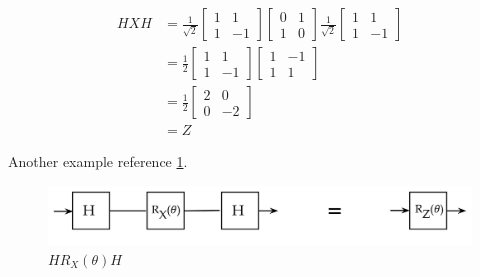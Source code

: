 \documentclass[main.tex]{subfiles}
\begin{document}
    $$
    \begin{aligned}
    H X H &=\frac{1}{\sqrt{2}}\left[\begin{array}{cc}
    1 & 1 \\
    1 & -1
    \end{array}\right]\left[\begin{array}{cc}
    0 & 1 \\
    1 & 0
    \end{array}\right] \frac{1}{\sqrt{2}}\left[\begin{array}{cc}
    1 & 1 \\
    1 & -1
    \end{array}\right] \\
    &=\frac{1}{2}\left[\begin{array}{cc}
    1 & 1 \\
    1 & -1
    \end{array}\right]\left[\begin{array}{cc}
    1 & -1 \\
    1 & 1
    \end{array}\right] \\
    &=\frac{1}{2}\left[\begin{array}{cc}
    2 & 0 \\
    0 & -2
    \end{array}\right] \\
    &=Z
    \end{aligned}
    $$
    
    Another example reference \ref{fig:09gate8}.
    
    \begin{figure}
        \centering
        \includegraphics[width=5in]{notes/figs/n08/09gate8.png}
        \caption{$H R_X(\theta) H$}
        \label{fig:09gate8}
    \end{figure}
    
\end{document}
